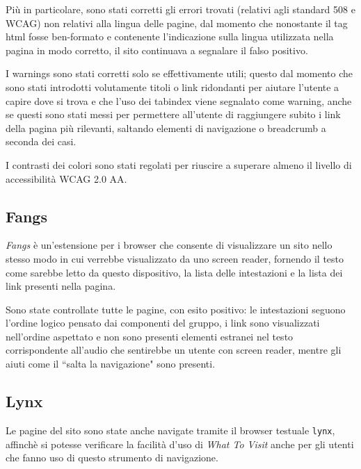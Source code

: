Più in particolare, sono stati corretti gli errori trovati (relativi agli
standard 508 e WCAG) non relativi alla lingua delle pagine, dal momento che
nonostante il tag html fosse ben-formato e contenente l'indicazione sulla
lingua utilizzata nella pagina in modo corretto, il sito continuava a
segnalare il falso positivo.

I warnings sono stati corretti solo se effettivamente utili; questo dal
momento che sono stati introdotti volutamente titoli o link ridondanti per
aiutare l'utente a capire dove si trova e che l'uso dei tabindex viene
segnalato come warning, anche se questi sono stati messi per permettere
all'utente di raggiungere subito i link della pagina più rilevanti, saltando
elementi di navigazione o breadcrumb a seconda dei casi.

I contrasti dei colori sono stati regolati per riuscire a superare almeno il
livello di accessibilità WCAG 2.0 AA.

\subsection{Fangs}\label{sec:fangs}
\textit{Fangs} è un'estensione per i browser che consente di visualizzare un
sito nello stesso modo in cui verrebbe visualizzato da uno screen reader,
fornendo il testo come sarebbe letto da questo dispositivo, la lista delle
intestazioni e la lista dei link presenti nella pagina.

Sono state controllate tutte le pagine, con esito positivo: le intestazioni
seguono l'ordine logico pensato dai componenti del gruppo, i link sono
visualizzati nell'ordine aspettato e non sono presenti elementi estranei nel
testo corrispondente all'audio che sentirebbe un utente con screen reader,
mentre gli aiuti come il ``salta la navigazione" sono presenti.

\subsection{Lynx}\label{sec:lynx}
Le pagine del sito sono state anche navigate tramite il browser testuale
\texttt{lynx}, affinchè si potesse verificare la facilità d'uso di
\textit{What To Visit} anche per gli utenti che fanno uso di questo
strumento di navigazione.

